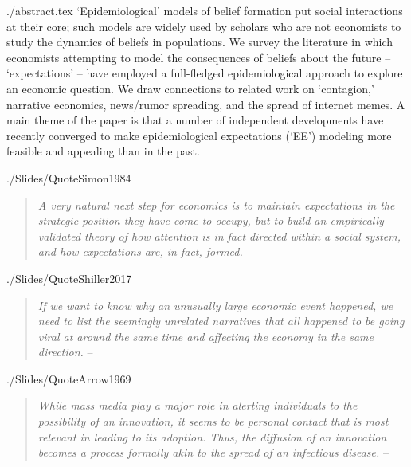 \begin{verbatimwrite}{./abstract.tex}
  `Epidemiological' models of belief formation put social interactions at their core; such models are widely used by scholars who are not economists to study the dynamics of beliefs in populations.  We survey the literature in which economists attempting to model the consequences of beliefs about the future -- `expectations' -- have employed a full-fledged epidemiological approach to explore an economic question.  We draw connections to related work on `contagion,' narrative economics, news/rumor spreading, and the spread of internet memes. A main theme of the paper is that a number of independent developments have recently converged to make epidemiological expectations (`EE') modeling more feasible and appealing than in the past.
\end{verbatimwrite}

\begin{verbatimwrite}{./Slides/QuoteSimon1984}
  \begin{quote}
    \textit{A very natural next step for economics is to maintain expectations in	the strategic position they have come to occupy, but to build an empirically validated theory of how attention is in fact directed within a social system, and how expectations are, in fact, formed.}
    \medskip
    \indent -- 
  \end{quote}
\end{verbatimwrite}

\begin{verbatimwrite}{./Slides/QuoteShiller2017}
  \begin{quote}
    \textit{If we want to know why an unusually large economic event happened, we need to list the seemingly unrelated narratives that all happened to be going viral at around the same time and affecting the economy in the same direction.}
    \medskip
    \indent -- 
  \end{quote}
\end{verbatimwrite}


\begin{verbatimwrite}{./Slides/QuoteArrow1969}
  \begin{quote}
    \textit{While mass media play a major role in alerting individuals to the possibility of an innovation, it seems to be personal contact that is most relevant in leading to its adoption. Thus, the diffusion of an innovation becomes a process formally akin to the spread of an infectious disease.}
    \medskip
    \indent -- 
  \end{quote}
\end{verbatimwrite}

